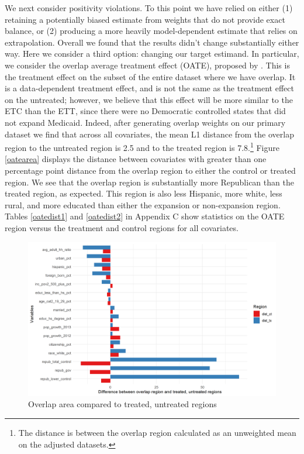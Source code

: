 \documentclass[12pt]{article}
\begin{document}
We next consider positivity violations. To this point we have relied on either (1) retaining a potentially biased estimate from weights that do not provide exact balance, or (2) producing a more heavily model-dependent estimate that relies on extrapolation. Overall we found that the results didn't change substantially either way. Here we consider a third option: changing our target estimand. In particular, we consider the overlap average treatment effect (OATE), proposed by \cite{li2018balancing}. This is the treatment effect on the subset of the entire dataset where we have overlap. It is a data-dependent treatment effect, and is not the same as the treatment effect on the untreated; however, we believe that this effect will be more similar to the ETC than the ETT, since there were no Democratic controlled states that did not expand Medicaid. Indeed, after generating overlap weights on our primary dataset we find that across all covariates, the mean L1 distance from the overlap region to the untreated region is 2.5 and to the treated region is 7.8.\footnote{The distance is between the overlap region calculated as an unweighted mean on the adjusted datasets.} Figure \ref{oatearea} displays the distance between covariates with greater than one percentage point distance from the overlap region to either the control or treated region. We see that the overlap region is substantially more Republican than the treated region, as expected. This region is also less Hispanic, more white, less rural, and more educated than either the expansion or non-expansion region. Tables \ref{oatedist1} and \ref{oatedist2} in Appendix C show statistics on the OATE region versus the treatment and control regions for all covariates.

\begin{figure}[]
\begin{center}
    \includegraphics[scale=0.6]{01_Plots/oate-imbalances.png}
    \caption{Overlap area compared to treated, untreated regions}
    \label{oateimbalance}
\end{center}
\end{figure}
\end{document}
